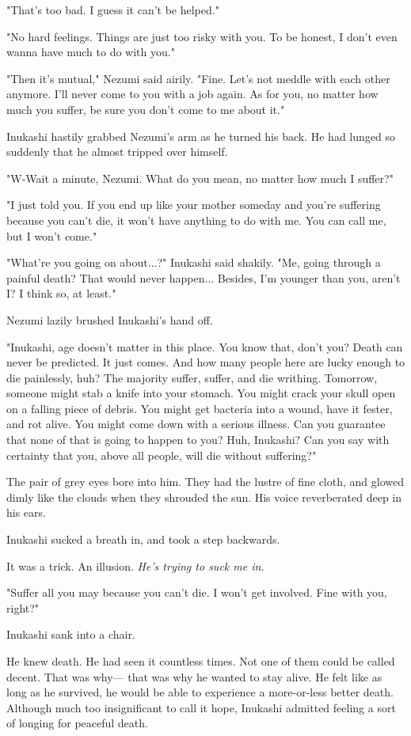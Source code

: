 "That's too bad. I guess it can't be helped."

"No hard feelings. Things are just too risky with you. To be honest, I
don't even wanna have much to do with you."

"Then it's mutual," Nezumi said airily. "Fine. Let's not meddle with
each other anymore. I'll never come to you with a job again. As for you,
no matter how much you suffer, be sure you don't come to me about it."

Inukashi hastily grabbed Nezumi's arm as he turned his back. He had
lunged so suddenly that he almost tripped over himself.

"W-Wait a minute, Nezumi. What do you mean, no matter how much I
suffer?"

"I just told you. If you end up like your mother someday and you're
suffering because you can't die, it won't have anything to do with me.
You can call me, but I won't come."

"What're you going on about...?" Inukashi said shakily. "Me, going
through a painful death? That would never happen... Besides, I'm younger
than you, aren't I? I think so, at least."

Nezumi lazily brushed Inukashi's hand off.

"Inukashi, age doesn't matter in this place. You know that, don't you?
Death can never be predicted. It just comes. And how many people here
are lucky enough to die painlessly, huh? The majority suffer, suffer,
and die writhing. Tomorrow, someone might stab a knife into your
stomach. You might crack your skull open on a falling piece of debris.
You might get bacteria into a wound, have it fester, and rot alive. You
might come down with a serious illness. Can you guarantee that none of
that is going to happen to you? Huh, Inukashi? Can you say with
certainty that you, above all people, will die without suffering?"

The pair of grey eyes bore into him. They had the lustre of fine cloth,
and glowed dimly like the clouds when they shrouded the sun. His voice
reverberated deep in his ears.

Inukashi sucked a breath in, and took a step backwards.

It was a trick. An illusion. \emph{He's trying to suck me in.}

"Suffer all you may because you can't die. I won't get involved. Fine
with you, right?"

Inukashi sank into a chair.

He knew death. He had seen it countless times. Not one of them could be
called decent. That was why--- that was why he wanted to stay alive. He
felt like as long as he survived, he would be able to experience a
more-or-less better death. Although much too insignificant to call it
hope, Inukashi admitted feeling a sort of longing for peaceful death.

